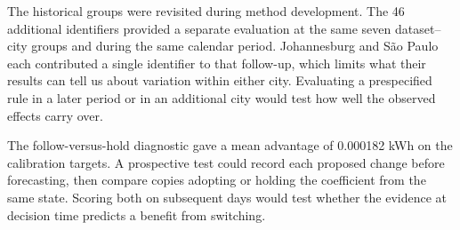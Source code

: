 The historical groups were revisited during method development. The 46 additional identifiers provided a separate evaluation at the same seven dataset--city groups and during the same calendar period. Johannesburg and S\~ao Paulo each contributed a single identifier to that follow-up, which limits what their results can tell us about variation within either city. Evaluating a prespecified rule in a later period or in an additional city would test how well the observed effects carry over.

The follow-versus-hold diagnostic gave a mean advantage of 0.000182 kWh on the calibration targets. A prospective test could record each proposed change before forecasting, then compare copies adopting or holding the coefficient from the same state. Scoring both on subsequent days would test whether the evidence at decision time predicts a benefit from switching.

